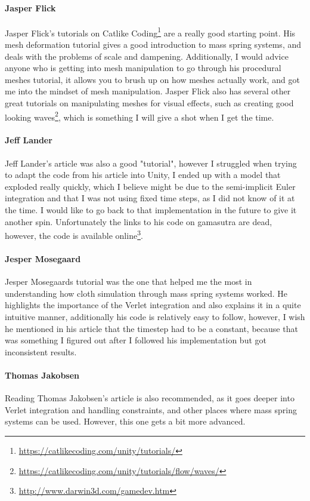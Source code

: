 \paragraph{Jasper Flick}
Jasper Flick's tutorials on Catlike Coding\footnote{\url{https://catlikecoding.com/unity/tutorials/}}
are a really good starting point. His mesh deformation tutorial gives a good introduction to mass spring systems, and deals with the problems of scale and dampening.
Additionally, I would advice anyone who is getting into mesh manipulation to go through his procedural meshes tutorial,
it allows you to brush up on how meshes actually work, and got me into the mindset of mesh manipulation.
Jasper Flick also has several other great tutorials on manipulating meshes for visual effects, such as creating good looking waves\footnote{\url{https://catlikecoding.com/unity/tutorials/flow/waves/}}, which is something I will give a shot when I get the time.

\paragraph{Jeff Lander} 
Jeff Lander's article was also a good "tutorial", however I struggled when trying to adapt the code from his article\cite{jeff_lander_real_time_cloth} into Unity,
I ended up with a model that exploded really quickly, which I believe might be due to the semi-implicit Euler integration and that I was not using fixed time steps,
as I did not know of it at the time. I would like to go back to that implementation in the future to give it another spin. 
Unfortunately the links to his code on gamasutra are dead, however, the code is available online\footnote{\url{http://www.darwin3d.com/gamedev.htm}}.

\paragraph{Jesper Mosegaard}
Jesper Mosegaards tutorial\cite{mosegaards_clothing_simulation} was the one that helped me the most in understanding how cloth simulation through mass spring systems worked.
He highlights the importance of the Verlet integration and also explains it in a quite intuitive manner, additionally his code
is relatively easy to follow, however, I wish he mentioned in his article that the timestep had to be a constant, because that was something I figured out
after I followed his implementation but got inconsistent results.

\paragraph{Thomas Jakobsen}
Reading Thomas Jakobsen's\cite{jakobsen_advanced_character_physics} article is also recommended, as it goes deeper into Verlet integration and handling constraints,
and other places where mass spring systems can be used. However, this one gets a bit more advanced.

